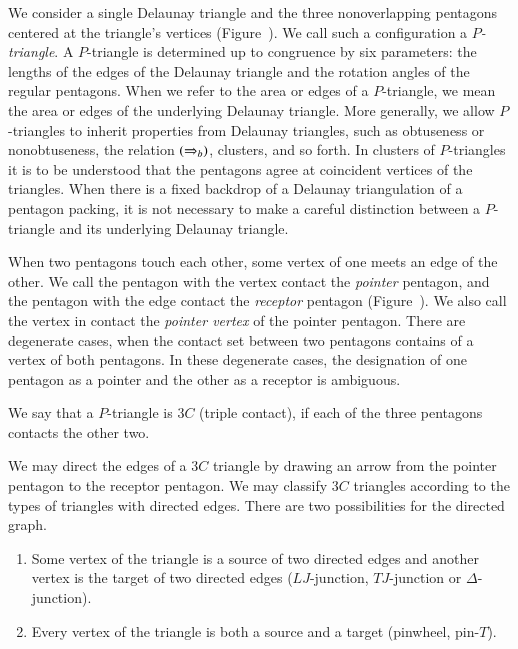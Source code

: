 We consider a single Delaunay triangle and the three nonoverlapping
pentagons centered at the triangle's vertices
(Figure~).  We call such a configuration a {\it
  $P$-triangle}.  A $P$-triangle is determined up to congruence by six
parameters: the lengths of the edges of the Delaunay triangle and the
rotation angles of the regular pentagons.  When we refer to the area
or edges of a $P$-triangle, we mean the area or edges of the
underlying Delaunay triangle.  More generally, we allow $P$-triangles
to inherit properties from Delaunay triangles, such as obtuseness or
nonobtuseness, the relation $(\Rightarrow_{b})$, clusters, and so forth. In
clusters of $P$-triangles it is to be understood that the pentagons
agree at coincident vertices of the triangles.  When there is a
fixed backdrop of a Delaunay triangulation of a pentagon packing, it
is not necessary to make a careful distinction between a $P$-triangle
and its underlying Delaunay triangle.


When two pentagons touch each other, some vertex of one meets an edge
of the other.  We call the pentagon with the vertex contact the {\it
  pointer} pentagon, and the pentagon with the edge contact the {\it
  receptor} pentagon (Figure~).  We also call the
vertex in contact the {\it pointer vertex} of the pointer
pentagon. There are degenerate cases, when the contact set between two
pentagons contains of a vertex of both pentagons.  In these degenerate
cases, the designation of one pentagon as a pointer and the other as a
receptor is ambiguous.




We say that a $P$-triangle is $3C$ (triple contact),
if each of the three pentagons contacts the other two.

We may direct the edges of a $3C$ triangle by drawing an arrow from
the pointer pentagon to the receptor pentagon.  We may classify $3C$
triangles according to the types of triangles with directed edges.
There are two possibilities for the directed graph.
\begin{enumerate}
\item Some vertex of the triangle is a source of two directed edges
  and another vertex is the target of two directed edges
  ($LJ$-junction, $TJ$-junction or $\Delta$-junction).
\item Every vertex of the triangle is both a source and a target
  (pinwheel, pin-$T$).
\end{enumerate}

